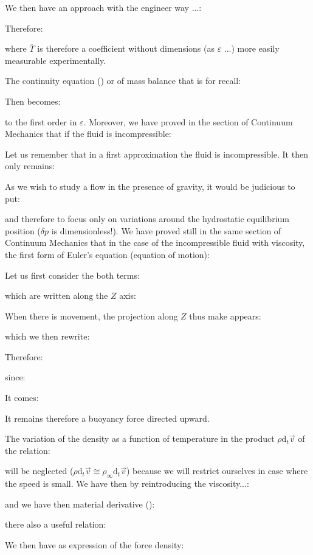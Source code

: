 	We then have an approach with the engineer way ...:
	
	Therefore:
	
	where $\bar{T}$ is therefore a coefficient without dimensions (as $\varepsilon$ ...) more easily measurable experimentally.

	The continuity equation () or of mass balance that is for recall:
	
	Then becomes:
	
	to the first order in $\varepsilon$. Moreover, we have proved in the section of Continuum Mechanics  that if the fluid is incompressible:
	
	Let us remember that in a first approximation the fluid is incompressible. It then only remains:
	
	As we wish to study a flow in the presence of gravity, it would be judicious to put:
	
	and therefore to focus only on variations around the hydrostatic equilibrium position ($\delta p$ is dimensionless!). We have proved still in the same section of Continuum Mechanics that in the case of the incompressible fluid with viscosity, the first form of Euler's equation (equation of motion):
	
	Let us first consider the both terms:
	
	which are written along the $Z$ axis:
	
	When there is movement, the projection along $Z$ thus make appears:
	
	which we then rewrite:
	
	Therefore:
	
	since:
	
	It comes:
	
	It remains therefore a buoyancy force directed upward.

	The variation of the density as a function of temperature in the product $\rho\mathrm{d}_t\vec{v}$ of the relation:
	
	will be neglected ($\rho\mathrm{d}_t\vec{v}\cong \rho_\infty \mathrm{d}_t\vec{v}$) because we will restrict ourselves in case where the speed is small. We have then by reintroducing the viscosity...:
	
	and we have then material derivative ():
	
	there also a useful relation:
	
	We then have as expression of the force density:
	
